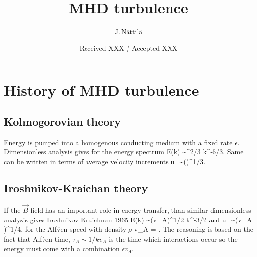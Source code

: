 \documentclass{aa}
\begin{document}
\title{MHD turbulence}

\author{J.\,N\"attil\"a}


\date{Received XXX / Accepted XXX}





\maketitle



\section{History of MHD turbulence}\label{sect:theory}

\subsection{Kolmogorovian theory}\label{sect:K41}

Energy is pumped into a homogenous conducting medium with a fixed rate $\epsilon$.
Dimensionless analysis gives for the energy spectrum \citep{Kolmogov_1941}
\be
E(k) \sim \epsilon^{2/3} k^{-5/3}.
\ee
Same can be written in terms of average velocity increments
\be
\delta u_\lambda \sim (\epsilon \lambda)^{1/3}.
\ee

\subsection{Iroshnikov-Kraichan theory}\label{sect:K65}

If the $\vec{B}$ field has an important role in energy transfer, than similar dimensionless analysis gives Iroshnikov Kraichnan 1965
\be
E(k) \sim (\epsilon v_A)^{1/2} k^{-3/2}
\ee
and
\be
\delta u_\lambda \sim (\epsilon v_A \lambda)^{1/4},
\ee
for the Alf\'ven speed with density $\rho$
\be
v_A = .
\ee
The reasoning is based on the fact that Alf\'ven time, $\tau_A \sim 1/k v_A$ is the time which interactions occur so the energy must come with a combination $\epsilon v_A$.
\end{document}
